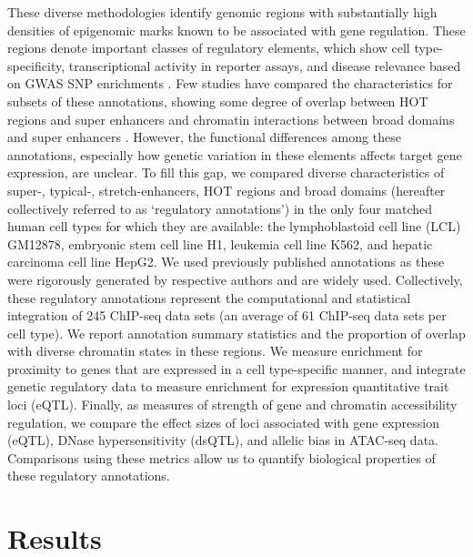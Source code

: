 These diverse methodologies identify genomic regions with substantially high densities of epigenomic marks known to be associated with gene regulation. These regions denote important classes of regulatory elements, which show cell type-specificity, transcriptional activity in reporter assays, and disease relevance based on GWAS SNP enrichments \cite{kvonHOTRegionsFunction2012, parkerChromatinStretchEnhancer2013, hniszSuperEnhancersControlCell2013, benayounH3K4me3BreadthLinked2014, boyleComparativeAnalysisRegulatory2014, linActiveMedulloblastomaEnhancers2016, blinkaSuperEnhancersNanogLocus2016, daveMiceDeficientMyc2017}. Few studies have compared the characteristics for subsets of these annotations, showing some degree of overlap between HOT regions and super enhancers \cite{liGenomewideIdentificationCharacterisation2016} and chromatin interactions between broad domains and super enhancers \cite{thibodeauChromatinInteractionNetworks2017}. However, the functional differences among these annotations, especially how genetic variation in these elements affects target gene expression, are unclear. To fill this gap, we compared diverse characteristics of super-, typical-, stretch-enhancers, HOT regions and broad domains (hereafter collectively referred to as ‘regulatory annotations’) in the only four matched human cell types for which they are available: the lymphoblastoid cell line (LCL) GM12878, embryonic stem cell line H1, leukemia cell line K562, and hepatic carcinoma cell line HepG2. We used previously published annotations as these were rigorously generated by respective authors and are widely used. Collectively, these regulatory annotations represent the computational and statistical integration of 245 ChIP-seq data sets (an average of 61 ChIP-seq data sets per cell type). We report annotation summary statistics and the proportion of overlap with diverse chromatin states in these regions. We measure enrichment for proximity to genes that are expressed in a cell type-specific manner, and integrate genetic regulatory data to measure enrichment for expression quantitative trait loci (eQTL). Finally, as measures of strength of gene and chromatin accessibility regulation, we compare the effect sizes of loci associated with gene expression (eQTL), DNase hypersensitivity (dsQTL), and allelic bias in ATAC-seq data. Comparisons using these metrics allow us to quantify biological properties of these regulatory annotations. \\

\section{Results}
